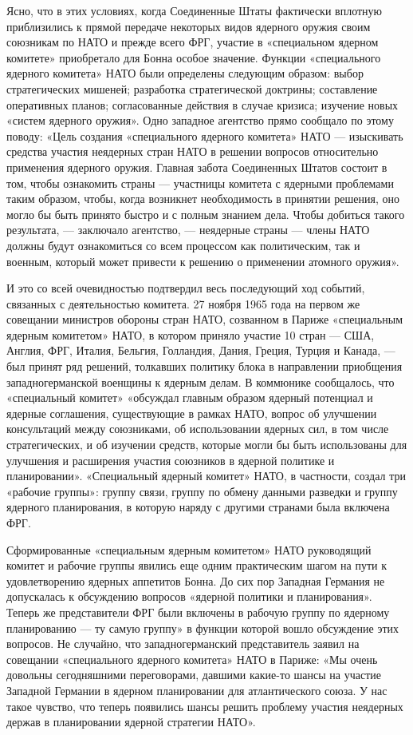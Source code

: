 \documentclass[12pt, a4paper, openany]{book}
\begin{document}
	Ясно, что в этих условиях, когда Соединенные Штаты фактически вплотную приблизились к прямой передаче некоторых видов ядерного оружия своим союзникам по НАТО и прежде всего ФРГ, участие в «специальном ядерном комитете» приобретало для Бонна особое значение. Функции «специального ядерного комитета» НАТО были определены следующим образом: выбор стратегических мишеней; разработка стратегической доктрины; составление оперативных планов; согласованные действия в случае кризиса; изучение новых «систем ядерного оружия». Одно западное агентство прямо сообщало по этому поводу: «Цель создания «специального ядерного комитета» НАТО — изыскивать средства участия неядерных стран НАТО в решении вопросов относительно применения ядерного оружия. Главная забота Соединенных Штатов состоит в том, чтобы ознакомить страны — участницы комитета с ядерными проблемами таким образом, чтобы, когда возникнет необходимость в принятии решения, оно могло бы быть принято быстро и с полным знанием дела. Чтобы добиться такого результата, — заключало агентство, — неядерные страны — члены НАТО должны будут ознакомиться со всем процессом как политическим, так и военным, который может привести к решению о применении атомного оружия».
	
	И это со всей очевидностью подтвердил весь последующий ход событий, связанных с деятельностью комитета. 27 ноября 1965 года на первом же совещании министров обороны стран НАТО, созванном в Париже «специальным ядерным комитетом» НАТО, в котором приняло участие 10 стран — США, Англия, ФРГ, Италия, Бельгия, Голландия, Дания, Греция, Турция и Канада, — был принят ряд решений, толкавших политику блока в направлении приобщения западногерманской военщины к ядерным делам. В коммюнике сообщалось, что «специальный комитет» «обсуждал главным образом ядерный потенциал и ядерные соглашения, существующие в рамках НАТО, вопрос об улучшении консультаций между союзниками, об использовании ядерных сил, в том числе стратегических, и об изучении средств, которые могли бы быть использованы для улучшения и расширения участия союзников в ядерной политике и планировании». «Специальный ядерный комитет» НАТО, в частности, создал три «рабочие группы»: группу связи, группу по обмену данными разведки и группу ядерного планирования, в которую наряду с другими странами была включена ФРГ.
	
	Сформированные «специальным ядерным комитетом» НАТО руководящий комитет и рабочие группы явились еще одним практическим шагом на пути к удовлетворению ядерных аппетитов Бонна. До сих пор Западная Германия не допускалась к обсуждению вопросов «ядерной политики и планирования». Теперь же представители ФРГ были включены в рабочую группу по ядерному планированию — ту самую группу» в функции которой вошло обсуждение этих вопросов. Не случайно, что западногерманский представитель заявил на совещании «специального ядерного комитета» НАТО в Париже: «Мы очень довольны сегодняшними переговорами, давшими какие-то шансы на участие Западной Германии в ядерном планировании для атлантического союза. У нас такое чувство, что теперь появились шансы решить проблему участия неядерных держав в планировании ядерной стратегии НАТО».
	
\end{document}
